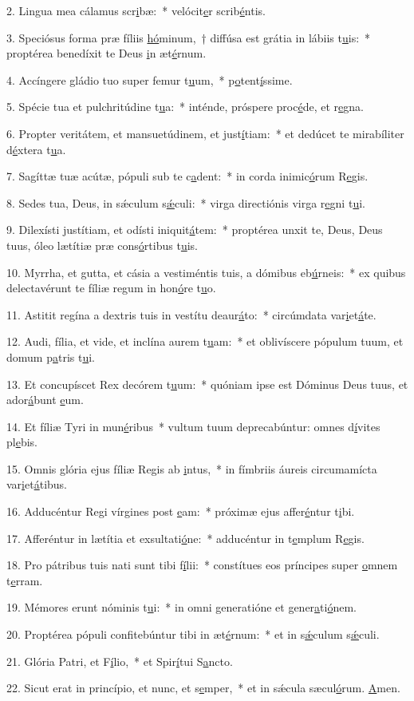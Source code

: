 2. Lingua mea cálamus scr\uline{i}bæ:~* velócit\uline{e}r scrib\uline{é}ntis.\par 
3. Speciósus forma præ fíliis \uline{hó}minum,~† diffúsa est grátia in lábiis t\uline{u}is:~* proptérea benedíxit te Deus \uline{i}n æt\uline{é}rnum.\par 
4. Accíngere gládio tuo super femur t\uline{u}um,~* p\uline{o}tent\uline{í}ssime.\par 
5. Spécie tua et pulchritúdine t\uline{u}a:~* inténde, próspere proc\uline{é}de, et r\uline{e}gna.\par 
6. Propter veritátem, et mansuetúdinem, et just\uline{í}tiam:~* et dedúcet te mirabíliter d\uline{é}xtera t\uline{u}a.\par 
7. Sagíttæ tuæ acútæ, pópuli sub te c\uline{a}dent:~* in corda inimic\uline{ó}rum R\uline{e}gis.\par 
8. Sedes tua, Deus, in sǽculum s\uline{ǽ}culi:~* virga directiónis virga r\uline{e}gni t\uline{u}i.\par 
9. Dilexísti justítiam, et odísti iniquit\uline{á}tem:~* proptérea unxit te, Deus, Deus tuus, óleo lætítiæ præ cons\uline{ó}rtibus t\uline{u}is.\par 
10. Myrrha, et gutta, et cásia a vestiméntis tuis, a dómibus eb\uline{ú}rneis:~* ex quibus delectavérunt te fíliæ regum in hon\uline{ó}re t\uline{u}o.\par 
11. Astitit regína a dextris tuis in vestítu deaur\uline{á}to:~* circúmdata var\uline{i}et\uline{á}te.\par 
12. Audi, fília, et vide, et inclína aurem t\uline{u}am:~* et oblivíscere pópulum tuum, et domum p\uline{a}tris t\uline{u}i.\par 
13. Et concupíscet Rex decórem t\uline{u}um:~* quóniam ipse est Dóminus Deus tuus, et ador\uline{á}bunt \uline{e}um.\par 
14. Et fíliæ Tyri in mun\uline{é}ribus~* vultum tuum deprecabúntur: omnes d\uline{í}vites pl\uline{e}bis.\par 
15. Omnis glória ejus fíliæ Regis ab \uline{i}ntus,~* in fímbriis áureis circumamícta var\uline{i}et\uline{á}tibus.\par 
16. Adducéntur Regi vírgines post \uline{e}am:~* próximæ ejus affer\uline{é}ntur t\uline{i}bi.\par 
17. Afferéntur in lætítia et exsultati\uline{ó}ne:~* adducéntur in t\uline{e}mplum R\uline{e}gis.\par 
18. Pro pátribus tuis nati sunt tibi f\uline{í}lii:~* constítues eos príncipes super \uline{o}mnem t\uline{e}rram.\par 
19. Mémores erunt nóminis t\uline{u}i:~* in omni generatióne et gener\uline{a}ti\uline{ó}nem.\par 
20. Proptérea pópuli confitebúntur tibi in æt\uline{é}rnum:~* et in s\uline{ǽ}culum s\uline{ǽ}culi.\par 
21. Glória Patri, et F\uline{í}lio,~* et Spir\uline{í}tui S\uline{a}ncto.\par 
22. Sicut erat in princípio, et nunc, et s\uline{e}mper,~* et in sǽcula sæcul\uline{ó}rum. \uline{A}men.\par 
